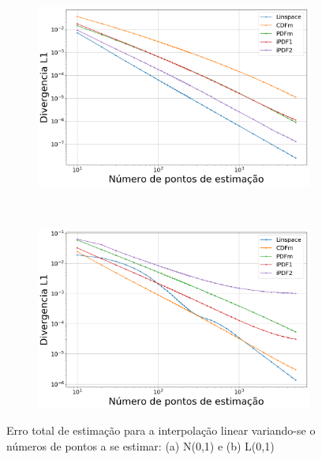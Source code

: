 \begin{figure}[H]
	\centering
	\begin{subfigure}[b]{0.45\textwidth}
		\centering 
		\includegraphics[width=\textwidth]{./figuras/ERRORPLOT_L1_TRUE_NORMAL_LINEAR_00}
		\caption{}
		\label{fig:errornormlin}
	\end{subfigure}
	\hfill
	~ %
	\begin{subfigure}[b]{0.45\textwidth}
		\centering 
		\includegraphics[width=\textwidth]{./figuras/ERRORPLOT_L1_TRUE_LOGNORMAL_LINEAR_00}
		\caption{}
		\label{fig:errorloglin}
	\end{subfigure}
	
	\caption{Erro total de estimação para a interpolação linear variando-se o números de pontos a se estimar: (a) N(0,1) e (b) L(0,1)}
	\label{fig:errorplotlin}
\end{figure}

